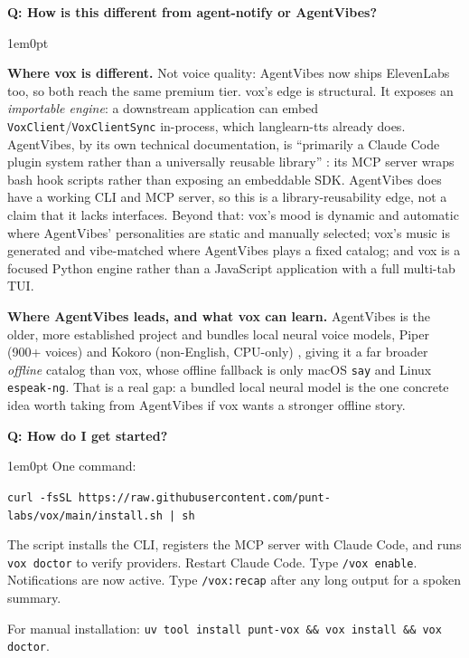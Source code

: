 \documentclass[11pt,letterpaper]{article}
\newcounter{faqnum}
\newenvironment{faqpair}[1]{%
  \needspace{4\baselineskip}%
  \vspace{0.5em}%
  \refstepcounter{faqnum}%
  \noindent\textbf{\color{SectionBlue}Q\thefaqnum: #1}\par\nopagebreak[4]%
  \vspace{0.2em}%
  \begin{adjustwidth}{1em}{0pt}%
  \setlength{\parindent}{0pt}%
}{%
  \end{adjustwidth}%
  \vspace{0.5em}%
}
\begin{document}
\begin{faqpair}{How is this different from agent-notify or AgentVibes?}
  \textbf{Where vox is different.} Not voice quality: AgentVibes
  now ships ElevenLabs too, so both reach the same premium tier. vox's edge is
  structural. It exposes an \emph{importable engine}: a downstream application
  can embed \texttt{VoxClient}/\texttt{VoxClientSync} in-process, which
  langlearn-tts already does. AgentVibes, by its own technical documentation, is
  ``primarily a Claude Code plugin system rather than a universally reusable
  library'' \cite{agentvibes2026technicaldeepdive}: its MCP server wraps bash
  hook scripts rather than exposing an embeddable SDK. AgentVibes does have a
  working CLI and MCP server, so this is a library-reusability edge, not a claim
  that it lacks interfaces. Beyond that: vox's mood is dynamic and automatic
  where AgentVibes' personalities are static and manually selected; vox's music
  is generated and vibe-matched where AgentVibes plays a fixed catalog; and vox
  is a focused Python engine rather than a JavaScript application with a full
  multi-tab TUI.

  \textbf{Where AgentVibes leads, and what vox can learn.} AgentVibes is the
  older, more established project and bundles local neural voice models,
  Piper (900+ voices) and Kokoro (non-English, CPU-only)
  \cite{agentvibes2026providers}, giving it a far broader \emph{offline}
  catalog than vox, whose offline fallback is only macOS \texttt{say} and Linux
  \texttt{espeak-ng}. That is a real gap: a bundled local neural model is the one
  concrete idea worth taking from AgentVibes if vox wants a stronger offline
  story.
\end{faqpair}

\begin{faqpair}{How do I get started?}\label{faq:getting-started}
  One command:

  {\small\texttt{curl -fsSL https://raw.githubusercontent.com/punt-labs/vox/main/install.sh | sh}}

  The script installs the CLI, registers the MCP server with Claude Code, and
  runs \texttt{vox doctor} to verify providers. Restart Claude Code. Type
  \texttt{/vox enable}. Notifications are now active. Type \texttt{/vox:recap} after
  any long output for a spoken summary.

  For manual installation:
  {\small\texttt{uv tool install punt-vox \&\& vox install \&\& vox doctor}}.
\end{faqpair}
\end{document}
